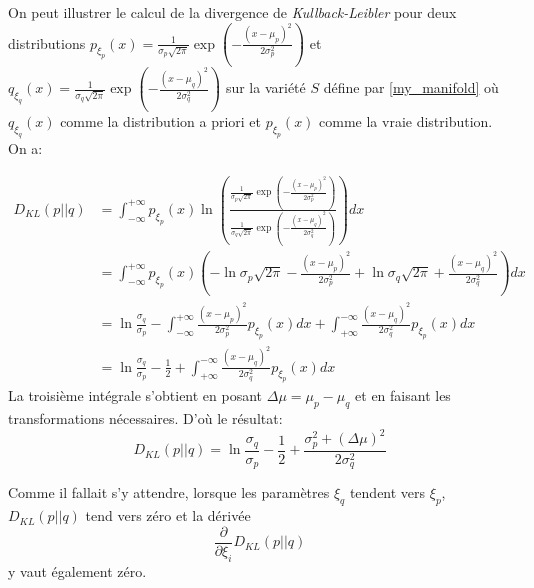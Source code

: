 \documentclass[11pt, letterpaper]{article}
\begin{document}
	On peut illustrer le calcul de la divergence de \textit{Kullback-Leibler} pour deux distributions $p_{\xi_p}(x)=\frac{1}{\sigma_p\sqrt{2\pi}}\exp\left(-\frac{(x-\mu_p)^2}{2\sigma_p^2}\right)$ et $q_{\xi_q}(x)=\frac{1}{\sigma_q\sqrt{2\pi}}\exp\left(-\frac{(x-\mu_q)^2}{2\sigma_q^2}\right)$ sur la variété $S$ défine par \eqref  {my_manifold} où $q_{\xi_q}(x)$ comme la distribution a priori et $p_{\xi_p}(x)$ comme la vraie distribution. On a:
	
	\begin{align*}
	  D_{KL}(p||q)&=\int_{-\infty}^{+\infty}p_{\xi_p}(x)\ln\left(\frac{\frac{1}{\sigma_p\sqrt{2\pi}}\exp\left(-\frac{(x-\mu_p)^2}{2\sigma_p^2}\right)}{\frac{1}{\sigma_q\sqrt{2\pi}}\exp\left(-\frac{(x-\mu_q)^2}{2\sigma_q^2}\right)}\right)dx\\
	  &=\int_{-\infty}^{+\infty}p_{\xi_p}(x)\left(-\ln\sigma_p\sqrt{2\pi}-\frac{(x-\mu_p)^2}{2\sigma_p^2}+\ln\sigma_q\sqrt{2\pi}+\frac{(x-\mu_q)^2}{2\sigma_q^2} \right)dx\\
	  &=\ln\frac{\sigma_q}{\sigma_p}-\int_{-\infty}^{+\infty}\frac{(x-\mu_p)^2}{2\sigma_p^2}p_{\xi_p}(x)dx+\int_{+\infty}^{-\infty   }\frac{(x-\mu_q)^2}{2\sigma_q^2}p_{\xi_p}(x)dx\\
	  &=\ln\frac{\sigma_q}{\sigma_p}-\frac{1}{2}+\int_{+\infty}^{-\infty   }\frac{(x-\mu_q)^2}{2\sigma_q^2}p_{\xi_p}(x)dx
	\end{align*}
	La troisième intégrale s'obtient en posant $\Delta\mu=\mu_p-\mu_q$ et en faisant les transformations nécessaires. D'où le résultat:
	\begin{equation*}
	   D_{KL}(p||q)=\ln\frac{\sigma_q}{\sigma_p}-\frac{1}{2}+\frac{\sigma_p^2+(\Delta\mu)^2}{2\sigma_q^2} 
	\end{equation*}
	
	Comme il fallait s'y attendre, lorsque les paramètres $\xi_q$ tendent vers $\xi_p$, $D_{KL}(p||q)$ tend vers zéro et la dérivée
	\begin{equation*}
	    \frac{\partial}{\partial\xi_i}D_{KL}(p||q)
	\end{equation*}
	y vaut également zéro.\\
	
\end{document}
